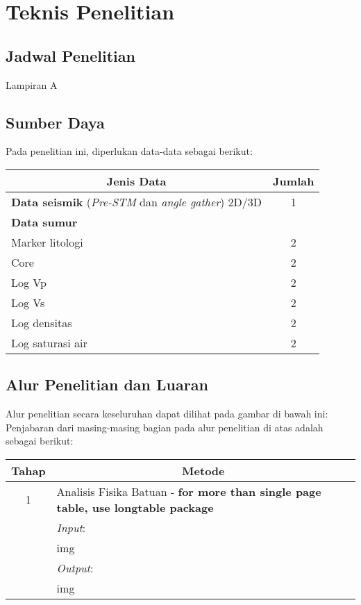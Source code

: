 \documentclass[main.tex]{subfiles}
\begin{document}
\chapter{Teknis Penelitian}

\section{Jadwal Penelitian}
Lampiran A

\section{Sumber Daya}
Pada penelitian ini, diperlukan data-data sebagai berikut:

\begin{center}
\begin{tabular}{l c}
    \hline
    \multicolumn{1}{c}{\textbf{Jenis Data}} & \textbf{Jumlah}\\
    \hline
    \textbf{Data seismik} (\emph{Pre-STM} dan \emph{angle gather}) 2D/3D & 1\\
    \textbf{Data sumur} & \\
    \quad Marker litologi & 2\\
    \quad Core & 2\\
    \quad Log Vp & 2\\
    \quad Log Vs & 2\\
    \quad Log densitas & 2\\
    \quad Log saturasi air & 2\\    
    \hline
\end{tabular}
\end{center}
\section{Alur Penelitian dan Luaran}
Alur penelitian secara keseluruhan dapat dilihat pada gambar di bawah ini:
Penjabaran dari masing-masing bagian pada alur penelitian di atas adalah sebagai berikut:
\begin{center}
    \begin{tabularx}{\linewidth}{c X}
        \hline
        \textbf{Tahap} & \multicolumn{1}{c}{\textbf{Metode}} \\
        \hline
        1 & Analisis Fisika Batuan - \textbf{for more than single page table, use longtable package}\\
        & \emph{Input}: \\
        & img \\
        & \emph{Output}: \\
        & img \\
        \hline
    \end{tabularx}
\end{center}
\end{document}
